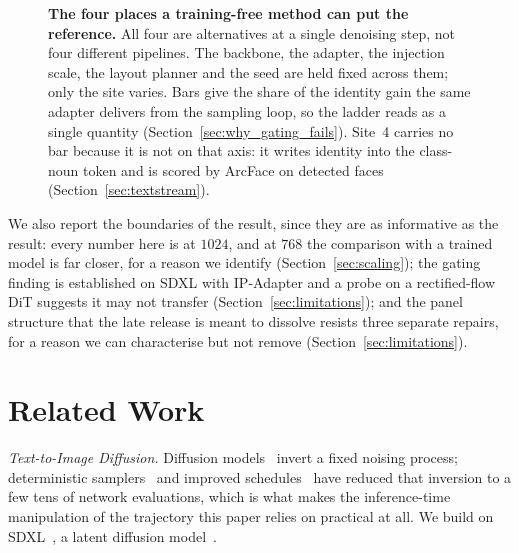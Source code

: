 \documentclass[10pt,twocolumn,letterpaper]{article}
\begin{document}
\begin{enumerate}
\end{enumerate}

\begin{figure}[t]
  \centering
  \makebox[\linewidth][c]{}
  \caption{%
    \textbf{The four places a training-free method can put the reference.}
    All four are alternatives at a single denoising step, not four different
    pipelines.  The backbone, the adapter, the injection scale, the layout
    planner and the seed are held fixed across them; only the site varies.  Bars
    give the share of the identity gain the same adapter delivers from the
    sampling loop, so the ladder reads as a single quantity
    (Section~\ref{sec:why_gating_fails}).  Site~4 carries no bar because it is
    not on that axis: it writes identity into the class-noun token and is
    scored by ArcFace on detected faces (Section~\ref{sec:textstream}).
  }
  \label{fig:ladder}
\end{figure}

We also report the boundaries of the result, since they are as informative as
the result: every number here is at $1024$, and at $768$ the comparison with
a trained model is far closer, for a reason we identify
(Section~\ref{sec:scaling}); the gating finding is established
on SDXL with IP-Adapter and a probe on a rectified-flow DiT suggests it may
not transfer (Section~\ref{sec:limitations}); and the panel structure that the
late release is meant to dissolve resists three separate repairs, for a reason
we can characterise but not remove (Section~\ref{sec:limitations}).

\section{Related Work}
\label{sec:related}

\noindent\textit{Text-to-Image Diffusion.}
Diffusion models~\cite{ho2020denoising} invert a fixed noising process;
deterministic samplers~\cite{song2021denoising,lu2022dpmsolver} and improved
schedules~\cite{karras2022elucidating} have reduced that inversion to a few
tens of network evaluations, which is what makes the inference-time
manipulation of the trajectory this paper relies on practical at all.  We
build on SDXL~\cite{podell2024sdxl}, a latent diffusion
model~\cite{rombach2022high}.
\end{document}
